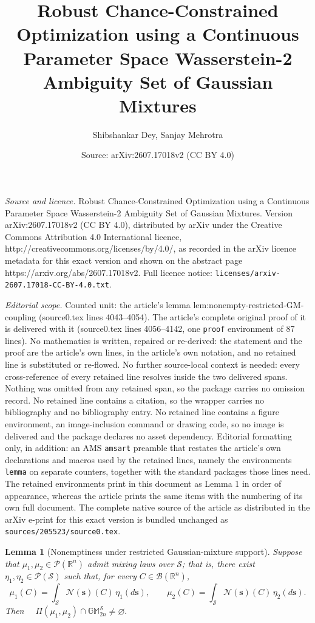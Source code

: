 \documentclass[10pt,a4paper]{amsart}
\title{Robust Chance-Constrained Optimization using a Continuous Parameter Space Wasserstein-2 Ambiguity Set of Gaussian Mixtures}
\author{Shibshankar Dey, Sanjay Mehrotra}
\date{Source: arXiv:2607.17018v2 (CC BY 4.0)}
\newtheorem{lemma}{Lemma}
\newcommand{\bs}{\bm{s}}
\newcommand{\mN}{\mathcal{N}}
\newcommand{\mbGM}{\mathbb{GM}}
\newcommand{\mbR}{\mathbb R}
\begin{document}
\maketitle

\noindent\emph{Source and licence.} Robust Chance-Constrained Optimization using a Continuous Parameter Space Wasserstein-2 Ambiguity Set of Gaussian Mixtures. Version arXiv:2607.17018v2 (CC BY 4.0), distributed by arXiv under the Creative Commons Attribution 4.0 International licence, http://creativecommons.org/licenses/by/4.0/, as recorded in the arXiv licence metadata for this exact version and shown on the abstract page https://arxiv.org/abs/2607.17018v2. Full licence notice: \texttt{licenses/arxiv-2607.17018-CC-BY-4.0.txt}.\par\smallskip

\noindent\textit{Editorial scope.} Counted unit: the article's lemma lem:nonempty-restricted-GM-coupling (source0.tex lines 4043--4054). The article's complete original proof of it is delivered with it (source0.tex lines 4056--4142, one \texttt{proof} environment of 87 lines). No mathematics is written, repaired or re-derived: the statement and the proof are the article's own lines, in the article's own notation, and no retained line is substituted or re-flowed.  No further source-local context is needed: every cross-reference of every retained line resolves inside the two delivered spans.  Nothing was omitted from any retained span, so the package carries no omission record.  No retained line contains a citation, so the wrapper carries no bibliography and no bibliography entry.  No retained line contains a figure environment, an image-inclusion command or drawing code, so no image is delivered and the package declares no asset dependency.  Editorial formatting only, in addition: an AMS \texttt{amsart} preamble that restates the article's own declarations and macros used by the retained lines, namely the environments \texttt{lemma} on separate counters, together with the standard packages those lines need.  The retained environments print in this document as Lemma 1 in order of appearance, whereas the article prints the same items with the numbering of its own full document.  The complete native source of the article as distributed in the arXiv e-print for this exact version is bundled unchanged as \texttt{sources/205523/source0.tex}.
\begin{lemma}[Nonemptiness under restricted Gaussian-mixture support]
\label{lem:nonempty-restricted-GM-coupling}
Suppose that \(\mu_1,\mu_2\in\mathcal P(\mbR^n)\) admit mixing laws over
\(\mathcal S\); that is, there exist \(\eta_1,\eta_2\in\mathcal P(\mathcal S)\)
such that, for every \(C\in\mathcal B(\mbR^n)\),
\[
\mu_1(C)=\int_{\mathcal S}\mN(\bs)(C)\,\eta_1(d\bs),
\qquad
\mu_2(C)=\int_{\mathcal S}\mN(\bs)(C)\,\eta_2(d\bs).
\]
Then $\quad \Pi(\mu_1,\mu_2)\cap \mbGM_{2n}^{\mathcal S}\neq\varnothing.$
\end{lemma}
\end{document}
